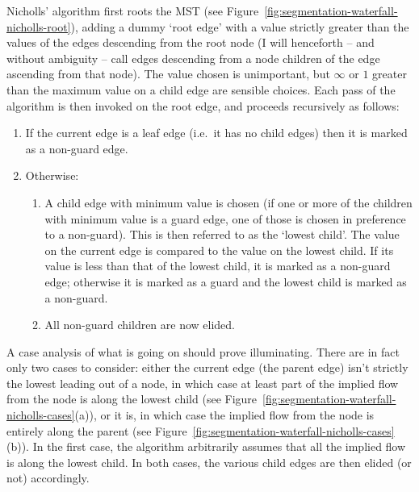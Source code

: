 
Nicholls' algorithm first roots the MST (see Figure~\ref{fig:segmentation-waterfall-nicholls-root}), adding a dummy `root edge' with a value strictly greater than the values of the edges descending from the root node (I will henceforth -- and without ambiguity -- call edges descending from a node children of the edge ascending from that node). The value chosen is unimportant, but $\infty$ or $1$ greater than the maximum value on a child edge are sensible choices. Each pass of the algorithm is then invoked on the root edge, and proceeds recursively as follows:

\begin{enumerate}

\item If the current edge is a leaf edge (i.e.~it has no child edges) then it is marked as a non-guard edge.

\item Otherwise:

\begin{enumerate}

\item A child edge with minimum value is chosen (if one or more of the children with minimum value is a guard edge, one of those is chosen in preference to a non-guard). This is then referred to as the `lowest child'. The value on the current edge is compared to the value on the lowest child. If its value is less than that of the lowest child, it is marked as a non-guard edge; otherwise it is marked as a guard and the lowest child is marked as a non-guard.

\item All non-guard children are now elided.

\end{enumerate}

\end{enumerate}

A case analysis of what is going on should prove illuminating. There are in fact only two cases to consider: either the current edge (the parent edge) isn't strictly the lowest leading out of a node, in which case at least part of the implied flow from the node is along the lowest child (see Figure~\ref{fig:segmentation-waterfall-nicholls-cases}(a)), or it is, in which case the implied flow from the node is entirely along the parent (see Figure~\ref{fig:segmentation-waterfall-nicholls-cases}(b)). In the first case, the algorithm arbitrarily assumes that all the implied flow is along the lowest child. In both cases, the various child edges are then elided (or not) accordingly.

